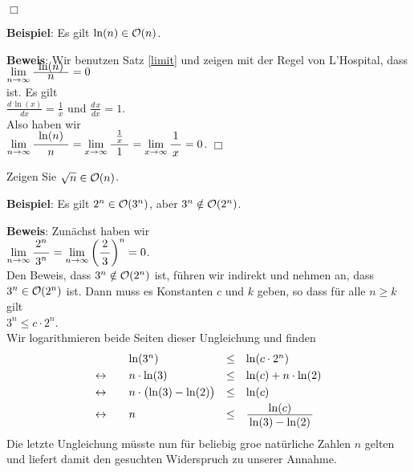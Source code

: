 \hspace*{\fill} $\Box$
\vspace*{0.3cm}

\noindent
\textbf{Beispiel}: Es gilt $\ln(n) \in \mathcal{O}(n)$.
\vspace*{0.3cm}

\noindent
\textbf{Beweis}: Wir benutzen Satz \ref{limit} und zeigen mit der Regel von L'Hospital,
dass \\[0.1cm]
\hspace*{1.3cm} 
$\lim\limits_{n \rightarrow \infty} \bruch{\;\ln(n)\;}{n} = 0$
\\[0.1cm]
ist.  Es gilt \\[0.1cm]
\hspace*{1.3cm} $\displaystyle \frac{d\, \ln(x)}{dx} = \frac{1}{x}$ 
\quad und \quad
 $\displaystyle \frac{d\, x}{dx} = 1$. \\[0.1cm]
Also haben wir \\[0.1cm]
\hspace*{1.3cm} 
$\displaystyle \lim\limits_{n \rightarrow \infty} \bruch{\;\ln(n)\;}{n} = 
\lim\limits_{x \rightarrow \infty} \bruch{\rule[-10pt]{0pt}{10pt}\;\frac{1}{x}\;}{1} = 
\lim\limits_{x \rightarrow \infty} \bruch{1}{x} = 0$. \hspace*{\fill} $\Box$
\vspace*{0.3cm}

\exercise
Zeigen Sie $\sqrt{n} \in \mathcal{O}(n)$.
\vspace*{0.3cm}

\noindent
\textbf{Beispiel}:  Es gilt $2^n \in \mathcal{O}(3^n)$, aber $3^n \notin \mathcal{O}(2^n)$.
\vspace*{0.3cm}

\noindent
\textbf{Beweis}:  Zun\"achst haben wir \\[0.1cm]
\hspace*{1.3cm} 
$\displaystyle\lim\limits_{n \rightarrow \infty} \bruch{2^n}{3^n} = 
 \lim\limits_{n \rightarrow \infty} \left(\bruch{2}{3}\right)^n = 0$.
\\[0.1cm]
Den Beweis, dass $3^n \notin \mathcal{O}(2^n)$ ist, f\"uhren wir indirekt und nehmen an, dass 
$3^n \in \mathcal{O}(2^n)$ ist.  Dann muss es Konstanten $c$ und $k$ geben, so dass f\"ur alle $n
\geq k$ gilt \\[0.1cm]
\hspace*{1.3cm} $3^n \leq c \cdot 2^n$. \\[0.1cm]
Wir logarithmieren beide Seiten dieser Ungleichung und finden \\[0.1cm]
\[
\begin{array}{llcl}
                & \ln(3^n) & \leq & \ln(c \cdot 2^n) \\[0.1cm]
\leftrightarrow\quad &  n \cdot \ln(3) & \leq & \ln(c) + n \cdot \ln(2) \\[0.1cm]
\leftrightarrow &  n \cdot \bigl(\ln(3) - \ln(2)\bigr) & \leq & \ln(c)  \\[0.1cm]
\leftrightarrow &  n  & \leq & \bruch{\ln(c)}{\ln(3) - \ln(2)}  \\[0.1cm]
\end{array}
\]
Die letzte Ungleichung m\"usste nun f\"ur beliebig gro\3e nat\"urliche Zahlen $n$ gelten und liefert
damit den gesuchten Widerspruch zu unserer Annahme.


